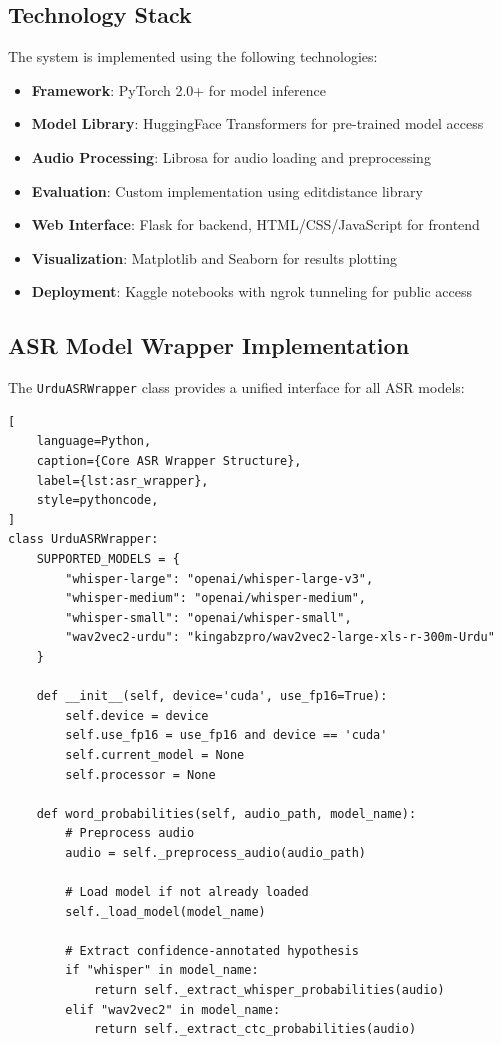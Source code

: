 \subsection{Technology Stack}

The system is implemented using the following technologies:

\begin{itemize}
    \item \textbf{Framework}: PyTorch 2.0+ for model inference
    \item \textbf{Model Library}: HuggingFace Transformers for pre-trained model access
    \item \textbf{Audio Processing}: Librosa for audio loading and preprocessing
    \item \textbf{Evaluation}: Custom implementation using editdistance library
    \item \textbf{Web Interface}: Flask for backend, HTML/CSS/JavaScript for frontend
    \item \textbf{Visualization}: Matplotlib and Seaborn for results plotting
    \item \textbf{Deployment}: Kaggle notebooks with ngrok tunneling for public access
\end{itemize}

\subsection{ASR Model Wrapper Implementation}

The \texttt{UrduASRWrapper} class provides a unified interface for all ASR models:

\begin{lstlisting}[
    language=Python,
    caption={Core ASR Wrapper Structure},
    label={lst:asr_wrapper},
    style=pythoncode,
]
class UrduASRWrapper:
    SUPPORTED_MODELS = {
        "whisper-large": "openai/whisper-large-v3",
        "whisper-medium": "openai/whisper-medium",
        "whisper-small": "openai/whisper-small",
        "wav2vec2-urdu": "kingabzpro/wav2vec2-large-xls-r-300m-Urdu"
    }
    
    def __init__(self, device='cuda', use_fp16=True):
        self.device = device
        self.use_fp16 = use_fp16 and device == 'cuda'
        self.current_model = None
        self.processor = None
        
    def word_probabilities(self, audio_path, model_name):
        # Preprocess audio
        audio = self._preprocess_audio(audio_path)
        
        # Load model if not already loaded
        self._load_model(model_name)
        
        # Extract confidence-annotated hypothesis
        if "whisper" in model_name:
            return self._extract_whisper_probabilities(audio)
        elif "wav2vec2" in model_name:
            return self._extract_ctc_probabilities(audio)
\end{lstlisting}

